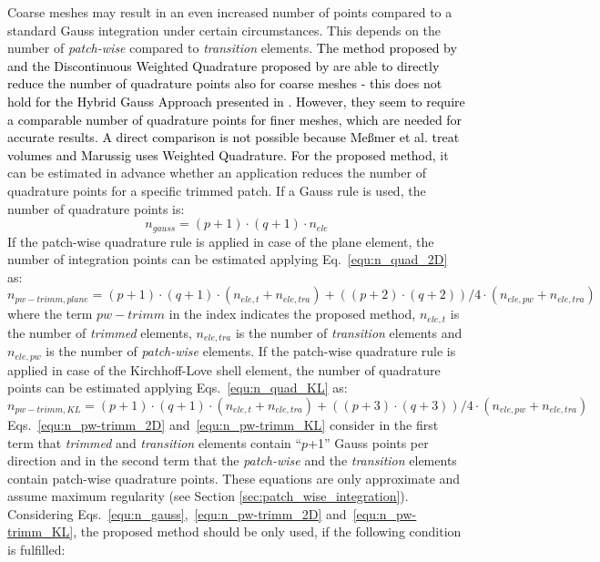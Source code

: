 \documentclass[3p]{elsarticle}
\newcommand{\reviewed}{\textcolor{black}}	%
\begin{document}
Coarse meshes may result in an even increased number of points compared to a standard Gauss integration under certain circumstances. This depends on the number of \textit{patch-wise} compared to \textit{transition} elements. \reviewed{The method proposed by \cite{Messmer2022} and the Discontinuous Weighted Quadrature proposed by \cite{Marussig2022} are able to directly reduce the number of quadrature points also for coarse meshes - this does not hold for the Hybrid Gauss Approach presented in \cite{Marussig2022}. However, they seem to require a comparable number of quadrature points for finer meshes, which are needed for accurate results. A direct comparison is not possible because Meßmer et al. \cite{Messmer2022} treat volumes and Marussig \cite{Marussig2022} uses Weighted Quadrature. For the proposed method,} it can be estimated in advance whether an application reduces the number of quadrature points for a specific trimmed patch. If a Gauss rule is used, the number of quadrature points is:
\begin{equation}\label{equ:n_gauss}
	n_{gauss} = (p+1)\cdot (q+1)\cdot n_{ele}
\end{equation}
If the patch-wise quadrature rule is applied in case of the plane element, the number of integration points can be estimated applying Eq.~\eqref{equ:n_quad_2D} as: 
\begin{equation}\label{equ:n_pw-trimm_2D}
	n_{pw-trimm,plane} = (p+1)\cdot (q+1)\cdot (n_{ele,t}+n_{ele,tra})+((p+2)\cdot (q+2))/4\cdot (n_{ele,pw}+n_{ele,tra})
\end{equation}
where the term $pw-trimm$ in the index indicates the proposed method, $n_{ele,t}$ is the number of \textit{trimmed} elements, $n_{ele,tra}$ is the number of \textit{transition} elements and $n_{ele,pw}$ is the number of \textit{patch-wise} elements. If the patch-wise quadrature rule is applied in case of the Kirchhoff-Love shell element, the number of quadrature points can be estimated applying Eqs.~\eqref{equ:n_quad_KL} as:
\begin{equation}\label{equ:n_pw-trimm_KL}
	n_{pw-trimm,KL} = (p+1)\cdot (q+1)\cdot (n_{ele,t}+n_{ele,tra})+((p+3)\cdot (q+3))/4\cdot (n_{ele,pw}+n_{ele,tra})
\end{equation}
Eqs.~\eqref{equ:n_pw-trimm_2D} and~\eqref{equ:n_pw-trimm_KL} consider in the first term that \textit{trimmed} and \textit{transition} elements contain ``$p$+1'' Gauss points per direction and in the second term that the \textit{patch-wise} and the \textit{transition} elements contain patch-wise quadrature points. These equations are only approximate and assume maximum regularity (see Section \ref{sec:patch_wise_integration}). Considering Eqs.~\eqref{equ:n_gauss},~\eqref{equ:n_pw-trimm_2D} and~\eqref{equ:n_pw-trimm_KL}, the proposed method should be only used, if the following condition is fulfilled:
\end{document}
